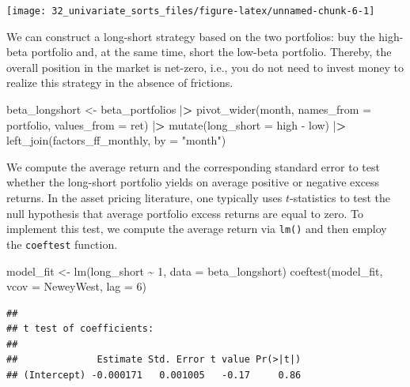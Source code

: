\documentclass[
]{book}
\newenvironment{Shaded}{\begin{snugshade}}{\end{snugshade}}
\newcommand{\AttributeTok}[1]{\textcolor[rgb]{0.61,0.61,0.61}{#1}}
\newcommand{\DecValTok}[1]{\textcolor[rgb]{0.06,0.06,0.06}{#1}}
\newcommand{\ErrorTok}[1]{\textcolor[rgb]{0.14,0.14,0.14}{\textbf{#1}}}
\newcommand{\FunctionTok}[1]{\textcolor[rgb]{0,0,0}{#1}}
\newcommand{\NormalTok}[1]{#1}
\newcommand{\OtherTok}[1]{\textcolor[rgb]{0.37,0.37,0.37}{#1}}
\newcommand{\SpecialCharTok}[1]{\textcolor[rgb]{0,0,0}{#1}}
\newcommand{\StringTok}[1]{\textcolor[rgb]{0.5,0.5,0.5}{#1}}
\begin{document}
\begin{center}\texttt{[image: 32\_univariate\_sorts\_files/figure-latex/unnamed-chunk-6-1]} \end{center}

We can construct a long-short strategy based on the two portfolios: buy the high-beta portfolio and, at the same time, short the low-beta portfolio. Thereby, the overall position in the market is net-zero, i.e., you do not need to invest money to realize this strategy in the absence of frictions.

\begin{Shaded}
\begin{Highlighting}[]
\NormalTok{beta\_longshort }\OtherTok{\textless{}{-}}\NormalTok{ beta\_portfolios }\SpecialCharTok{|}\ErrorTok{\textgreater{}}
  \FunctionTok{pivot\_wider}\NormalTok{(month, }\AttributeTok{names\_from =}\NormalTok{ portfolio, }\AttributeTok{values\_from =}\NormalTok{ ret) }\SpecialCharTok{|}\ErrorTok{\textgreater{}}
  \FunctionTok{mutate}\NormalTok{(}\AttributeTok{long\_short =}\NormalTok{ high }\SpecialCharTok{{-}}\NormalTok{ low) }\SpecialCharTok{|}\ErrorTok{\textgreater{}}
  \FunctionTok{left\_join}\NormalTok{(factors\_ff\_monthly, }\AttributeTok{by =} \StringTok{"month"}\NormalTok{)}
\end{Highlighting}
\end{Shaded}

We compute the average return and the corresponding standard error to test whether the long-short portfolio yields on average positive or negative excess returns. In the asset pricing literature, one typically uses \citet{Newey1987} \(t\)-statistics to test the null hypothesis that average portfolio excess returns are equal to zero. To implement this test, we compute the average return via \texttt{lm()} and then employ the \texttt{coeftest} function.

\begin{Shaded}
\begin{Highlighting}[]
\NormalTok{model\_fit }\OtherTok{\textless{}{-}} \FunctionTok{lm}\NormalTok{(long\_short }\SpecialCharTok{\textasciitilde{}} \DecValTok{1}\NormalTok{, }\AttributeTok{data =}\NormalTok{ beta\_longshort)}
\FunctionTok{coeftest}\NormalTok{(model\_fit, }\AttributeTok{vcov =}\NormalTok{ NeweyWest, }\AttributeTok{lag =} \DecValTok{6}\NormalTok{)}
\end{Highlighting}
\end{Shaded}

\begin{verbatim}
## 
## t test of coefficients:
## 
##              Estimate Std. Error t value Pr(>|t|)
## (Intercept) -0.000171   0.001005   -0.17     0.86
\end{verbatim}
\end{document}
